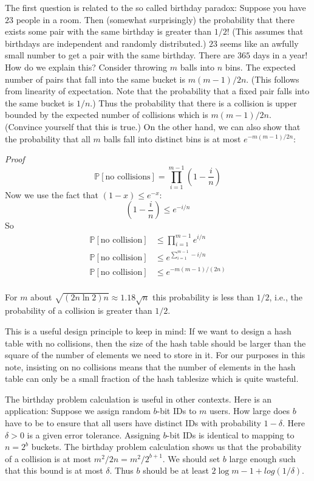 \documentclass [12pt]{article}
\begin{document}
The first question is related to the so called birthday paradox: Suppose you have $23$ people in a room. Then (somewhat surprisingly) the probability that there exists some pair with the same birthday is greater than $1/2$! (This assumes that birthdays are independent and randomly distributed.) $23$ seems like an awfully small number to get a pair with the same birthday. There are $365$ days in a year! How do we explain this? Consider throwing $m$ balls into $n$ bins. The expected number of pairs that fall into the same bucket is $m(m - 1)/2n$. (This follows from linearity of expectation. Note that the probability that a fixed pair falls into the same bucket is $1/n$.) Thus the probability that there is a collision is upper bounded by the expected number of collisions which is $m(m - 1)/2n$. (Convince yourself that this is true.) On the other hand, we can also show that the probability that all $m$ balls fall into distinct bins is at most $e^{-m(m-1)/2n}$:

\textit{Proof}
$$
\mathbb{P}[\text{no collisions}] = \prod_{i=1}^{m-1}\left( 1 - \frac{i}{n}\right)
$$
Now we use the fact that $(1-x) \leq e^{-x}$:
$$
\left(1 - \frac{i}{n}\right) \leq e^{-i/n}
$$
So
\begin{align*}
  \mathbb{P}[\text{no collision}] &\leq \prod_{i=1}^{m-1} e^{i/n} \\
  \mathbb{P}[\text{no collision}] &\leq e^{\sum_{i=1}^{m-1} -i/n} \\
  \mathbb{P}[\text{no collision}] &\leq e^{-m(m-1)/(2n)} \\
\end{align*}

For $m$ about $\sqrt{(2 n \ln 2)n} \approx 1.18\sqrt{n}$ this probability is less than $1/2$, i.e., the probability of a collision is greater than $1/2$.

This is a useful design principle to keep in mind: If we want to design a hash table with no collisions, then the size of the hash table should be larger than the square of the number of elements we need to store in it. For our purposes in this note, insisting on no collisions means that the number of elements in the hash table can only be a small fraction of the hash tablesize which is quite wasteful. 

The birthday problem calculation is useful in other contexts. Here is an application: Suppose we assign random $b$-bit IDs to $m$ users. How large does $b$ have to be to ensure that all users have distinct IDs with probability $1 - \delta$. Here $\delta > 0$ is a given error tolerance. Assigning $b$-bit IDs is identical to mapping to $n = 2^b$ buckets. The birthday problem calculation shows us that the probability of a collision is at most $m^2/2n = m^2/2^{b+1}$. We should set $b$ large enough such that this bound is at most $\delta$. Thus $b$ should be at least $2 \log m - 1 + log(1/\delta)$.
\end{document}
